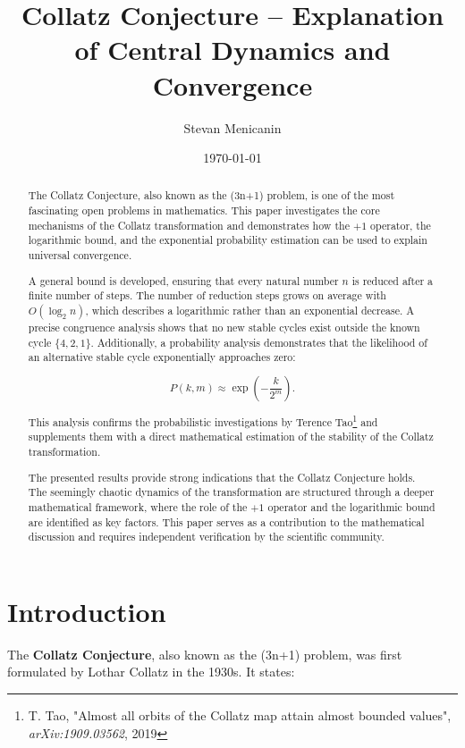 \documentclass[a4paper,12pt]{article}
\title{Collatz Conjecture – Explanation of Central Dynamics and Convergence}
\author{Stevan Menicanin}
\date{\today}
\begin{document}
\maketitle

\begin{abstract}
    The Collatz Conjecture, also known as the (3n+1) problem, is one of the most fascinating open problems in mathematics. This paper investigates the core mechanisms of the Collatz transformation and demonstrates how the \(+1\) operator, the logarithmic bound, and the exponential probability estimation can be used to explain universal convergence.

    A general bound is developed, ensuring that every natural number \( n \) is reduced after a finite number of steps. The number of reduction steps grows on average with \( O(\log_2 n) \), which describes a logarithmic rather than an exponential decrease. A precise congruence analysis shows that no new stable cycles exist outside the known cycle \( \{4, 2, 1\} \). Additionally, a probability analysis demonstrates that the likelihood of an alternative stable cycle exponentially approaches zero:

    \[
    P(k,m) \approx \exp\left(-\frac{k}{2^m}\right).
    \]

    This analysis confirms the probabilistic investigations by Terence Tao\footnote{T. Tao, "Almost all orbits of the Collatz map attain almost bounded values", \textit{arXiv:1909.03562}, 2019} and supplements them with a direct mathematical estimation of the stability of the Collatz transformation.

    The presented results provide strong indications that the Collatz Conjecture holds. The seemingly chaotic dynamics of the transformation are structured through a deeper mathematical framework, where the role of the \(+1\) operator and the logarithmic bound are identified as key factors. This paper serves as a contribution to the mathematical discussion and requires independent verification by the scientific community.
\end{abstract}

\newpage
\tableofcontents

\newpage

\section{Introduction}
The \textbf{Collatz Conjecture}, also known as the (3n+1) problem, was first formulated by Lothar Collatz in the 1930s. It states:
\end{document}
